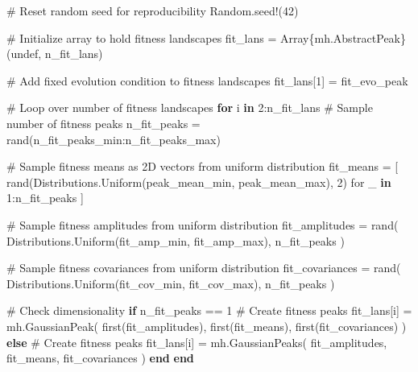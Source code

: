 \documentclass[
]{scrartcl}
\newenvironment{Shaded}{\begin{snugshade}}{\end{snugshade}}
\newcommand{\BuiltInTok}[1]{\textcolor[rgb]{0.00,0.23,0.31}{#1}}
\newcommand{\CommentTok}[1]{\textcolor[rgb]{0.37,0.37,0.37}{#1}}
\newcommand{\ConstantTok}[1]{\textcolor[rgb]{0.56,0.35,0.01}{#1}}
\newcommand{\ControlFlowTok}[1]{\textcolor[rgb]{0.00,0.23,0.31}{\textbf{#1}}}
\newcommand{\DataTypeTok}[1]{\textcolor[rgb]{0.68,0.00,0.00}{#1}}
\newcommand{\FloatTok}[1]{\textcolor[rgb]{0.68,0.00,0.00}{#1}}
\newcommand{\FunctionTok}[1]{\textcolor[rgb]{0.28,0.35,0.67}{#1}}
\newcommand{\KeywordTok}[1]{\textcolor[rgb]{0.00,0.23,0.31}{\textbf{#1}}}
\newcommand{\NormalTok}[1]{\textcolor[rgb]{0.00,0.23,0.31}{#1}}
\newcommand{\OperatorTok}[1]{\textcolor[rgb]{0.37,0.37,0.37}{#1}}
\begin{document}
\begin{Shaded}
\begin{Highlighting}[]
\CommentTok{\# Reset random seed for reproducibility}
\BuiltInTok{Random}\NormalTok{.}\FunctionTok{seed!}\NormalTok{(}\FloatTok{42}\NormalTok{)}

\CommentTok{\# Initialize array to hold fitness landscapes}
\NormalTok{fit\_lans }\OperatorTok{=} \FunctionTok{Array}\DataTypeTok{\{mh.AbstractPeak\}}\NormalTok{(}\ConstantTok{undef}\NormalTok{, n\_fit\_lans)}

\CommentTok{\# Add fixed evolution condition to fitness landscapes}
\NormalTok{fit\_lans[}\FloatTok{1}\NormalTok{] }\OperatorTok{=}\NormalTok{ fit\_evo\_peak}

\CommentTok{\# Loop over number of fitness landscapes}
\ControlFlowTok{for}\NormalTok{ i }\KeywordTok{in} \FloatTok{2}\OperatorTok{:}\NormalTok{n\_fit\_lans}
    \CommentTok{\# Sample number of fitness peaks}
\NormalTok{    n\_fit\_peaks }\OperatorTok{=} \FunctionTok{rand}\NormalTok{(n\_fit\_peaks\_min}\OperatorTok{:}\NormalTok{n\_fit\_peaks\_max)}

    \CommentTok{\# Sample fitness means as 2D vectors from uniform distribution}
\NormalTok{    fit\_means }\OperatorTok{=}\NormalTok{ [}
        \FunctionTok{rand}\NormalTok{(Distributions.}\FunctionTok{Uniform}\NormalTok{(peak\_mean\_min, peak\_mean\_max), }\FloatTok{2}\NormalTok{)}
\NormalTok{        for \_ }\KeywordTok{in} \FloatTok{1}\OperatorTok{:}\NormalTok{n\_fit\_peaks}
\NormalTok{    ]}

    \CommentTok{\# Sample fitness amplitudes from uniform distribution}
\NormalTok{    fit\_amplitudes }\OperatorTok{=} \FunctionTok{rand}\NormalTok{(}
\NormalTok{        Distributions.}\FunctionTok{Uniform}\NormalTok{(fit\_amp\_min, fit\_amp\_max), n\_fit\_peaks}
\NormalTok{    )}

    \CommentTok{\# Sample fitness covariances from uniform distribution}
\NormalTok{    fit\_covariances }\OperatorTok{=} \FunctionTok{rand}\NormalTok{(}
\NormalTok{        Distributions.}\FunctionTok{Uniform}\NormalTok{(fit\_cov\_min, fit\_cov\_max), n\_fit\_peaks}
\NormalTok{    )}

    \CommentTok{\# Check dimensionality}
    \ControlFlowTok{if}\NormalTok{ n\_fit\_peaks }\OperatorTok{==} \FloatTok{1}
        \CommentTok{\# Create fitness peaks}
\NormalTok{        fit\_lans[i] }\OperatorTok{=}\NormalTok{ mh.}\FunctionTok{GaussianPeak}\NormalTok{(}
            \FunctionTok{first}\NormalTok{(fit\_amplitudes), }\FunctionTok{first}\NormalTok{(fit\_means), }\FunctionTok{first}\NormalTok{(fit\_covariances)}
\NormalTok{        )}
    \ControlFlowTok{else}
        \CommentTok{\# Create fitness peaks}
\NormalTok{        fit\_lans[i] }\OperatorTok{=}\NormalTok{ mh.}\FunctionTok{GaussianPeaks}\NormalTok{(}
\NormalTok{            fit\_amplitudes, fit\_means, fit\_covariances}
\NormalTok{        )}
    \ControlFlowTok{end}
\ControlFlowTok{end}
\end{Highlighting}
\end{Shaded}
\end{document}
